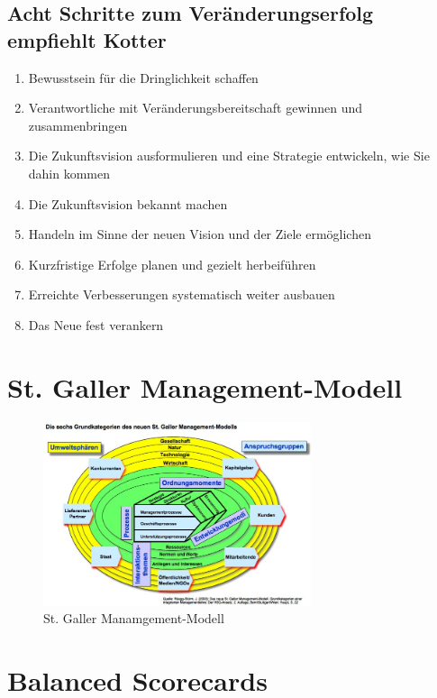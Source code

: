 \documentclass[]{scrreprt}
\begin{document}
    \subsection{Acht Schritte zum Veränderungserfolg empfiehlt Kotter}
    \begin{enumerate}
        \item Bewusstsein für die Dringlichkeit schaffen
        \item Verantwortliche mit Veränderungsbereitschaft gewinnen und zusammenbringen
        \item Die Zukunftsvision ausformulieren und eine Strategie entwickeln, wie Sie dahin kommen
        \item Die Zukunftsvision bekannt machen
        \item Handeln im Sinne der neuen Vision und der Ziele ermöglichen
        \item Kurzfristige Erfolge planen und gezielt herbeiführen
        \item Erreichte Verbesserungen systematisch weiter ausbauen
        \item Das Neue fest verankern
    \end{enumerate}
    
    \section{St. Galler Management-Modell}
    \begin{figure}[htbp]
    \begin{center}
    \includegraphics[width=0.7\textwidth,angle=0]{./st_galler.jpg}
    \caption{St. Galler Manamgement-Modell}
    \label{pic:st_galler}
    \end{center}
    \end{figure}
    
    \clearpage
    
    \section{Balanced Scorecards}
\end{document}
